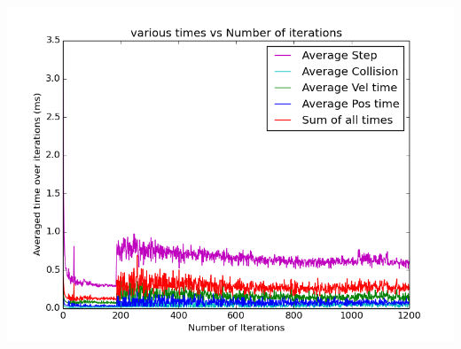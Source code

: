 \documentclass[11pt]{article}
\begin{document}
	\begin{center}
	  \includegraphics[scale=0.5]{images/g26_plot01_1200x150_uneven}
	\end{center}
	
\end{document}
